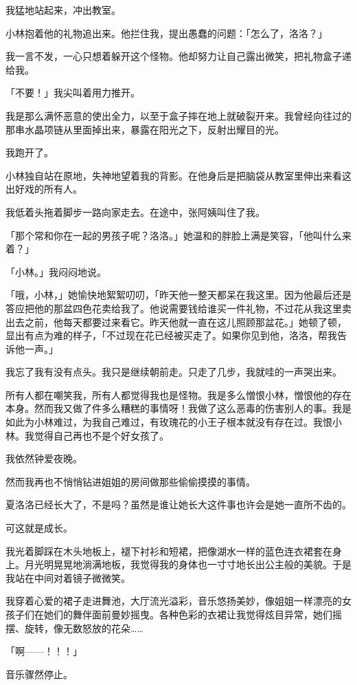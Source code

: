 \documentclass[UTF8]{ctexart}
\begin{document}
我猛地站起来，冲出教室。

小林抱着他的礼物追出来。他拦住我，提出愚蠢的问题：「怎么了，洛洛？」

我一言不发，一心只想着躲开这个怪物。他却努力让自己露出微笑，把礼物盒子递给我。

「不要！」我尖叫着用力推开。

我是那么满怀恶意的使出全力，以至于盒子摔在地上就破裂开来。我曾经向往过的那串水晶项链从里面掉出来，暴露在阳光之下，反射出耀目的光。

我跑开了。

小林独自站在原地，失神地望着我的背影。在他身后是把脑袋从教室里伸出来看这出好戏的所有人。

我低着头拖着脚步一路向家走去。在途中，张阿姨叫住了我。

「那个常和你在一起的男孩子呢？洛洛。」她温和的胖脸上满是笑容，「他叫什么来着？」

「小林。」我闷闷地说。

「哦，小林，」她愉快地絮絮叨叨，「昨天他一整天都呆在我这里。因为他最后还是答应把他的那盆四色花卖给我了。他说需要钱给谁买一件礼物，不过花从我这里卖出去之前，他每天都要过来看它。昨天他就一直在这儿照顾那盆花。」她顿了顿，显出有点为难的样子，「不过现在花已经被买走了。如果你见到他，洛洛，帮我告诉他一声。」

我忘了我有没有点头。我只是继续朝前走。只走了几步，我就哇的一声哭出来。

所有人都在嘲笑我，所有人都觉得我也是怪物。我是多么憎恨小林，憎恨他的存在本身。然而我又做了件多么糟糕的事情呀！我做了这么恶毒的伤害别人的事。我是如此为小林难过，为我自己难过，有玫瑰花的小王子根本就没有存在过。我恨小林。我觉得自己再也不是个好女孩了。

我依然钟爱夜晚。

然而我再也不悄悄钻进姐姐的房间做那些偷偷摸摸的事情。

夏洛洛已经长大了，不是吗？虽然是谁让她长大这件事也许会是她一直所不齿的。

可这就是成长。

我光着脚踩在木头地板上，褪下衬衫和短裙，把像湖水一样的蓝色连衣裙套在身上。月光明晃晃地淌满地板，我觉得我的身体也一寸寸地长出公主般的美貌。于是我站在中间对着镜子微微笑。

我穿着心爱的裙子走进舞池，大厅流光溢彩，音乐悠扬美妙，像姐姐一样漂亮的女孩子们在她们的舞伴面前曼妙摇曳。各种色彩的衣裙让我觉得炫目异常，她们摇摆、旋转，像无数怒放的花朵……

「啊——！！！」

音乐骤然停止。
\end{document}
